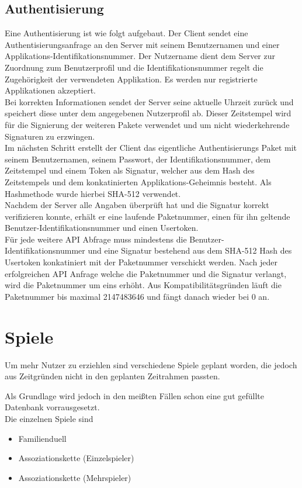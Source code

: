 \subsection{Authentisierung}
Eine Authentisierung ist wie folgt aufgebaut.
Der Client sendet eine Authentisierungsanfrage an den Server mit seinem
Benutzernamen und einer Applikations-Identifikationsnummer. Der Nutzername
dient dem Server zur Zuordnung zum Benutzerprofil und die Identifikationsnummer
regelt die Zugehörigkeit der verwendeten Applikation. Es werden nur registrierte
Applikationen akzeptiert.\\
Bei korrekten Informationen sendet der Server seine aktuelle Uhrzeit zurück
und speichert diese unter dem angegebenen Nutzerprofil ab. Dieser Zeitstempel
wird für die Signierung der weiteren Pakete verwendet und um nicht wiederkehrende
Signaturen zu erzwingen.\\
Im nächsten Schritt erstellt der Client das eigentliche Authentisierungs Paket mit
seinem Benutzernamen, seinem Passwort, der Identifikationsnummer, dem Zeitstempel
und einem Token als Signatur, welcher aus dem Hash des Zeitstempels und dem
konkatinierten Applikations-Geheimnis besteht. Als Hashmethode wurde hierbei
SHA-512 verwendet.\\
Nachdem der Server alle Angaben überprüft hat und die Signatur korrekt
verifizieren konnte, erhält er eine laufende Paketnummer, einen für ihn
geltende Benutzer-Identifikationsnummer und einen Usertoken.\\
Für jede weitere API Abfrage muss mindestens die Benutzer-Identifikationsnummer
und eine Signatur bestehend aus dem SHA-512 Hash des Usertoken konkatiniert mit
der Paketnummer verschickt werden. Nach jeder erfolgreichen API Anfrage welche
die Paketnummer und die Signatur verlangt, wird die Paketnummer um eins erhöht.
Aus Kompatibilitätsgründen läuft die Paketnummer bis maximal 2147483646 und
fängt danach wieder bei 0 an.


\section{Spiele}
Um mehr Nutzer zu erziehlen sind verschiedene Spiele geplant worden, die jedoch
aus Zeitgründen nicht in den geplanten Zeitrahmen passten.

Als Grundlage wird jedoch in den meißten Fällen schon eine gut gefüllte Datenbank
vorrausgesetzt.\\

Die einzelnen Spiele sind
\begin{itemize}
  \item Familienduell
  \item Assoziationskette (Einzelspieler)
  \item Assoziationskette (Mehrspieler)
\end{itemize}

